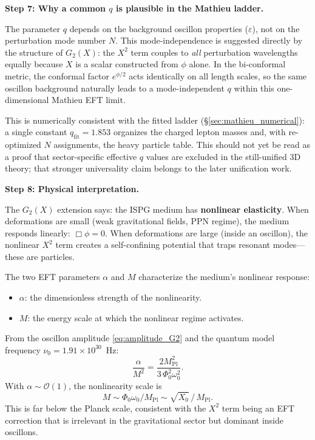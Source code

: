 \documentclass[11pt]{article}
\begin{document}
\medskip
\textbf{Step 7: Why a common $q$ is plausible in the Mathieu ladder.}

The parameter $q$ depends on the background oscillon
properties ($\varepsilon$), not on the perturbation mode
number $N$. This mode-independence is suggested directly by the
structure of $G_2(X)$: the $X^2$ term couples to
\emph{all} perturbation wavelengths equally because $X$
is a scalar constructed from $\phi$ alone. In the
bi-conformal metric, the conformal factor $e^{\phi/2}$
acts identically on all length scales, so the same oscillon
background naturally leads to a mode-independent $q$ within
this one-dimensional Mathieu EFT limit.

This is numerically consistent with the fitted ladder
(\S\ref{sec:mathieu_numerical}): a single constant
$q_{\mathrm{fit}} = 1.853$ organizes the charged lepton
masses and, with re-optimized $N$ assignments, the heavy
particle table. This should not yet be read as a proof
that sector-specific effective $q$ values are excluded in
the still-unified 3D theory; that stronger universality
claim belongs to the later unification work.

\medskip
\textbf{Step 8: Physical interpretation.}

The $G_2(X)$ extension says: the ISPG medium has
\textbf{nonlinear elasticity}. When deformations are
small (weak gravitational fields, PPN regime), the
medium responds linearly: $\Box\phi = 0$. When
deformations are large (inside an oscillon), the
nonlinear $X^2$ term creates a self-confining
potential that traps resonant modes---these are
particles.

The two EFT parameters $\alpha$ and $M$ characterize
the medium's nonlinear response:
\begin{itemize}
  \item $\alpha$: the dimensionless strength of the
    nonlinearity.
  \item $M$: the energy scale at which the nonlinear
    regime activates.
\end{itemize}
From the oscillon amplitude \eqref{eq:amplitude_G2}
and the quantum model frequency
$\nu_0 = 1.91 \times 10^{30}$~Hz:
\begin{equation}
  \frac{\alpha}{M^2}
  = \frac{2 M_{\mathrm{Pl}}^2}
  {3\,\Phi_0^2\omega_0^2}.
  \label{eq:alpha_over_M2}
\end{equation}
With $\alpha \sim \mathcal{O}(1)$, the nonlinearity
scale is
\begin{equation}
  M \sim \Phi_0\omega_0 / M_{\mathrm{Pl}}
  \sim \sqrt{X_0}\,/\,M_{\mathrm{Pl}}.
\end{equation}
This is far below the Planck scale, consistent with the
$X^2$ term being an EFT correction that is irrelevant
in the gravitational sector but dominant inside oscillons.
\end{document}
